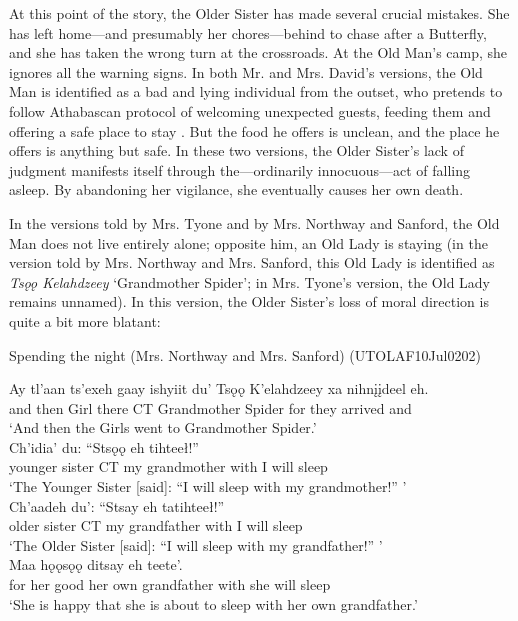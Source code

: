 At this point of the story, the Older Sister has made several crucial mistakes. She has left home—and presumably her chores—behind to chase after a Butterfly, and she has taken the wrong turn at the crossroads. At the Old Man's camp, she ignores all the warning signs. In both Mr. and Mrs. David's versions, the Old Man is identified as a bad and lying individual from the outset, who pretends to follow Athabascan protocol of welcoming unexpected guests, feeding them and offering a safe place to stay \citep[140]{GuedonM1974}. But the food he offers is unclean, and the place he offers is anything but safe. In these two versions, the Older Sister's lack of judgment manifests itself through the—ordinarily innocuous—act of falling asleep. By abandoning her vigilance, she eventually causes her own death.

In the versions told by Mrs. Tyone and by Mrs. Northway and Sanford, the Old Man does not live entirely alone; opposite him, an Old Lady is staying (in the version told by Mrs. Northway and Mrs. Sanford, this Old Lady is identified as {\em Tsǫǫ Kelahdzeey} `Grandmother Spider'; in Mrs. Tyone's version, the Old Lady remains unnamed). In this version, the Older Sister's loss of moral direction is quite a bit more blatant:

\begin{exe}
\ex Spending the night (Mrs. Northway and Mrs. Sanford) (UTOLAF10Jul0202) \label{brucks:sleep-with}
\begin{xlist}

\ex \gll Ay tl'aan {ts'exeh gaay} ishyiit du' Tsǫǫ K'elahdzeey xa nihnįįdeel eh.  \\
 and then Girl there CT Grandmother Spider for {they arrived} and \\
\glt `And then the Girls went to Grandmother Spider.' \\

\ex \gll Ch'idia' du: ``Stsǫǫ eh tihteeł!''  \\
 {younger sister} CT {my grandmother} with {I will sleep} \\
\glt `The Younger Sister [said]: ``I will sleep with my grandmother!'' ' \\

\ex \gll Ch'aadeh du': ``Stsay eh tatihteeł!''  \\
 {older sister} CT {my grandfather} with {I will sleep} \\
\glt `The Older Sister [said]: ``I will sleep with my grandfather!'' ' \\

\ex \gll Maa hǫǫsǫǫ ditsay eh teete'.  \\
 {for her} good {her own grandfather} with {she will sleep} \\
\glt `She is happy that she is about to sleep with her own grandfather.' \\
\end{xlist}
\end{exe}

